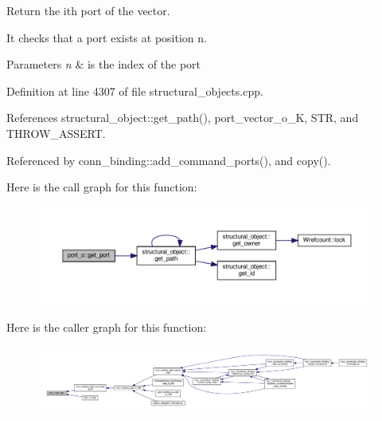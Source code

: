 Return the ith port of the vector. 

It checks that a port exists at position n. 
\begin{DoxyParams}{Parameters}
{\em n} & is the index of the port \\
\hline
\end{DoxyParams}


Definition at line 4307 of file structural\+\_\+objects.\+cpp.



References structural\+\_\+object\+::get\+\_\+path(), port\+\_\+vector\+\_\+o\+\_\+K, S\+TR, and T\+H\+R\+O\+W\+\_\+\+A\+S\+S\+E\+RT.



Referenced by conn\+\_\+binding\+::add\+\_\+command\+\_\+ports(), and copy().

Here is the call graph for this function\+:
\nopagebreak
\begin{figure}[H]
\begin{center}
\leavevmode
\includegraphics[width=350pt]{df/d75/structport__o_a7dda79b07635ab1129af2b1f10bc5890_cgraph}
\end{center}
\end{figure}
Here is the caller graph for this function\+:
\nopagebreak
\begin{figure}[H]
\begin{center}
\leavevmode
\includegraphics[width=350pt]{df/d75/structport__o_a7dda79b07635ab1129af2b1f10bc5890_icgraph}
\end{center}
\end{figure}
\mbox{\label{structport__o_a5b1def66023d9a1a0e63102c15e9b433}} 

